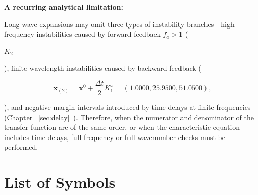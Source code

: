 \documentclass[11pt,a4paper,openany]{book}
\numberwithin{equation}{chapter}
\numberwithin{figure}{chapter}
\numberwithin{table}{chapter}
\begin{document}
\vspace{0.6em}
\textbf{A recurring analytical limitation:}




 Long-wave expansions may omit three types of instability branches—high-frequency instabilities caused by forward feedback $f_a>1$ (





$K_2$

), finite-wavelength instabilities caused by backward feedback (




\[
\bm x_{(2)}=\bm x^0+\frac{\Delta t}{2}K_1^x=(1.0000,25.9500,51.0500),
\]

), and negative margin intervals introduced by time delays at finite frequencies (Chapter ~\ref{sec:delay}~). Therefore, when the numerator and denominator of the transfer function are of the same order, or when the characteristic equation includes time delays, full-frequency or full-wavenumber checks must be performed.











\chapter*{List of Symbols}
\end{document}
